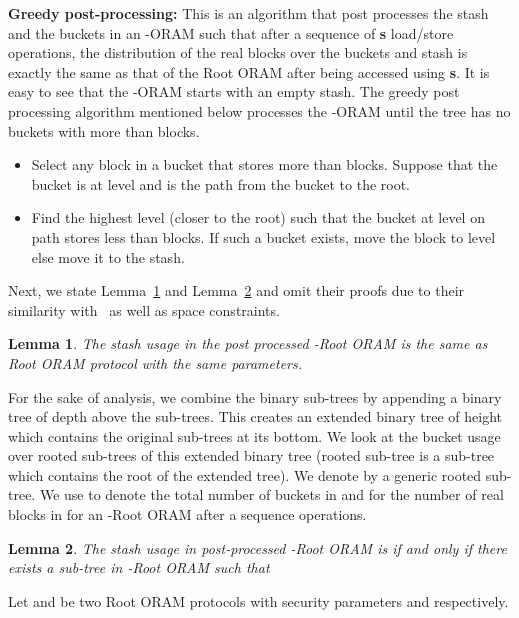 \documentclass[USenglish,oneside,twocolumn]{article}
\newtheorem{lemma}{Lemma}
\newcommand{\ourprotocol}{Root ORAM}
\begin{document}
\textbf{Greedy post-processing: }This is an algorithm that post processes the stash and the buckets in an -ORAM such that after a sequence of \textbf{s} load/store operations, the distribution of the real blocks over the buckets and stash is exactly the same as that of the \ourprotocol{} after being accessed using \textbf{s}. It is easy to see that the -ORAM starts with an empty stash. The greedy post processing algorithm mentioned below processes the -ORAM until the tree has no buckets with more than  blocks. 
\vspace{-5pt}
\begin{itemize}
\itemsep0em
\item Select any block in a bucket that stores more than  blocks. Suppose that the bucket is at level  and  is the path from the bucket to the root.
\item Find the highest level (closer to the root)  such that the bucket at level  on path  stores less than  blocks. If such a bucket exists, move the block to level  else move it to the stash.
\end{itemize}
\vspace{-5pt}


Next, we state Lemma~\ref{lem:lemma1} and Lemma~\ref{lem:lemma2} and omit their proofs due to their similarity with~\cite{pathoram} as well as space constraints.

\begin{lemma}\label{lem:lemma1}
The stash usage in the post processed -\ourprotocol{} is the same as \ourprotocol{} protocol with the same parameters.

\end{lemma}
For the sake of analysis, we combine the  binary sub-trees by appending a binary tree of depth  above the sub-trees. This creates an extended binary tree of height  which contains the original sub-trees at its bottom. We look at the bucket usage over rooted sub-trees of this extended binary tree (rooted sub-tree is a sub-tree which contains the root of the extended tree). We denote by  a generic rooted sub-tree. We use  to denote the total number of buckets in  and  for the number of real blocks in  for an -\ourprotocol{} after a sequence  operations. 
\begin{lemma}\label{lem:lemma2}
The stash usage  in post-processed -\ourprotocol{} is  if and only if there exists a sub-tree  in -\ourprotocol{} such that 
\end{lemma}
Let  and  be two \ourprotocol{} protocols with security parameters  and  respectively. 
\end{document}
